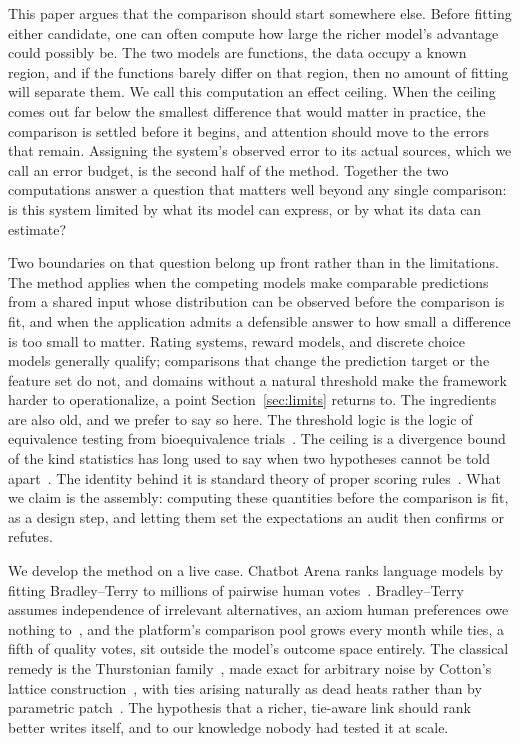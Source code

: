 \documentclass[10pt]{article}
\begin{document}
This paper argues that the comparison should start somewhere else.
Before fitting either candidate, one can often compute how large the
richer model's advantage could possibly be. The two models are functions, the
data occupy a known region, and if the functions barely differ on that
region, then no amount of fitting will separate them. We call this
computation an effect ceiling. When the ceiling comes out far below
the smallest difference that would matter in practice, the comparison
is settled before it begins, and attention should move to the errors
that remain. Assigning the system's observed error to its actual
sources, which we call an error budget, is the second half of the
method. Together the two computations answer a question that matters
well beyond any single comparison: is this system limited by what its
model can express, or by what its data can estimate?

Two boundaries on that question belong up front rather than in the
limitations. The method applies when the competing models make
comparable predictions from a shared input whose distribution can be
observed before the comparison is fit, and when the application
admits a defensible
answer to how small a difference is too small to matter. Rating
systems, reward models, and discrete choice models generally qualify;
comparisons that change the prediction target or the feature set do
not, and domains without a natural threshold make the framework harder
to operationalize, a point Section~\ref{sec:limits} returns to. The
ingredients are also old, and we prefer to say so here. The threshold
logic is the logic of equivalence testing from bioequivalence
trials~\citep{schuirmann1987}. The ceiling is a divergence bound of
the kind statistics has long used to say when two hypotheses cannot be
told apart~\citep{lecam1986, coverthomas2006}. The identity behind it
is standard theory of proper scoring
rules~\citep{gneitingraftery2007}. What we claim is the assembly:
computing these quantities before the comparison is fit, as a design
step,
and letting them set the expectations an audit then confirms or
refutes.

We develop the method on a live case. Chatbot Arena ranks language
models by fitting Bradley--Terry to millions of pairwise human
votes~\citep{chiang2024arena, bradleyterry1952}. Bradley--Terry
assumes independence of irrelevant alternatives, an axiom human
preferences owe nothing to~\citep{luce1959}, and the platform's
comparison pool grows every month while ties, a fifth of quality
votes, sit outside the model's outcome space entirely. The classical
remedy is the Thurstonian family~\citep{thurstone1927}, made exact for
arbitrary noise by Cotton's lattice construction~\citep{cotton2021},
with ties arising naturally as dead heats rather than by parametric
patch~\citep{davidson1970}. The hypothesis that a richer, tie-aware
link should rank better writes itself, and to our knowledge nobody had
tested it at scale.
\end{document}
